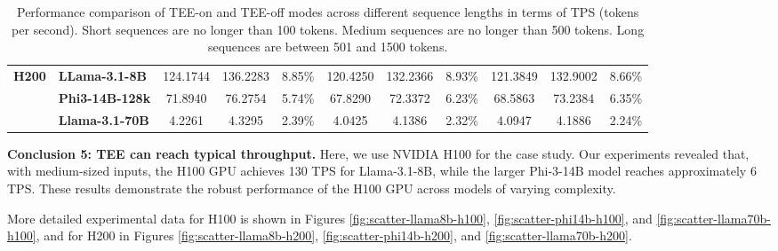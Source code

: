 \documentclass{article}
\begin{document}
\begin{table}[htbp]
{\begin{tabular}{llccc|ccc|ccc}
            \midrule
            \multirow{3}{*}{\textbf{H200}} & \textbf{LLama-3.1-8B}  & 124.1744                                            & 136.2283                                             & 8.85\%                                             & 120.4250        & 132.2366         & 8.93\%                                                                     & 121.3849        & 132.9002         & 8.66\%                                                                     \\
                                           & \textbf{Phi3-14B-128k} & 71.8940                                             & 76.2754                                              & 5.74\%                                             & 67.8290         & 72.3372          & 6.23\%                                                                     & 68.5863         & 73.2384          & 6.35\%                                                                     \\
                                           & \textbf{Llama-3.1-70B} & 4.2261                                              & 4.3295                                               & 2.39\%                                             & 4.0425          & 4.1386           & 2.32\%                                                                     & 4.0947          & 4.1886           & 2.24\%                                                                     \\
            \bottomrule
        \end{tabular}%
    }
    \caption{Performance comparison of TEE-on and TEE-off modes across different sequence lengths in terms of TPS (tokens per second). Short sequences are no longer than 100 tokens. Medium sequences are no longer than 500 tokens. Long sequences are between 501 and 1500 tokens.}
    \label{tab:tps_short_medium_long}
\end{table}

\noindent\textbf{Conclusion 5: TEE can reach typical throughput.}
Here, we use NVIDIA H100 for the case study. Our experiments revealed that, with medium-sized inputs, the H100 GPU achieves 130 TPS for Llama-3.1-8B, while the larger Phi-3-14B model reaches approximately 6 TPS. These results demonstrate the robust performance of the H100 GPU across models of varying complexity.

More detailed experimental data for H100 is shown in Figures \ref{fig:scatter-llama8b-h100}, \ref{fig:scatter-phi14b-h100}, and \ref{fig:scatter-llama70b-h100}, and for H200 in Figures \ref{fig:scatter-llama8b-h200}, \ref{fig:scatter-phi14b-h200}, and \ref{fig:scatter-llama70b-h200}.
\end{document}
